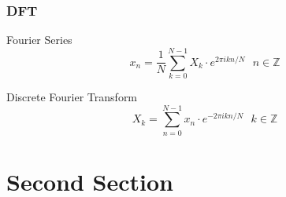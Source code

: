 \documentclass{beamer}
\begin{document}




\begin{frame}
\frametitle{DFT}
\begin{block}{Fourier Series}
$$x_n = \frac{1}{N}\sum_{k=0}^{N-1}X_k\cdot e^{2\pi ikn/N} \ \ \ n\in\mathbb{Z}$$
\end{block}

\begin{block}{Discrete Fourier Transform}
$$X_k = \sum_{n=0}^{N-1}x_n\cdot e^{-2\pi ikn/N} \ \ \ k\in\mathbb{Z}$$
\end{block}

\end{frame}






\section{Second Section}

\end{document}
